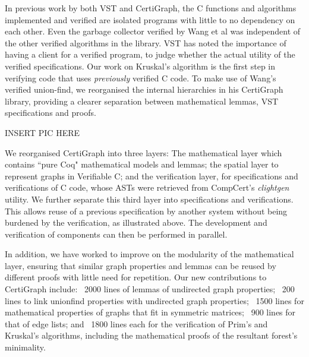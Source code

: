 In previous work by both VST and CertiGraph, the C functions and algorithms implemented and verified are isolated programs with little to no dependency on each other. Even the garbage collector verified by Wang et al\cite{DBLP:journals/pacmpl/WangCMH19} was independent of the other verified algorithms in the library. VST has noted the importance of having a client for a verified program, to judge whether the actual utility of the verified specifications\cite{DBLP:conf/iwmm/AppelN20}. Our work on Kruskal's algorithm is the first step in verifying code that uses \textit{previously} verified C code. To make use of Wang's verified union-find, we reorganised the internal hierarchies in his CertiGraph library, providing a clearer separation between mathematical lemmas, VST specifications and proofs.

INSERT PIC HERE

We reorganised CertiGraph into three layers: The mathematical layer which contains ``pure Coq" mathematical models and lemmas; the spatial layer to represent graphs in Verifiable C; and the verification layer, for specifications and verifications of C code, whose ASTs were retrieved from CompCert's \textit{clightgen} utility. We further separate this third layer into specifications and verifications. This allows reuse of a previous specification by another system without being burdened by the verification, as illustrated above. The development and verification of components can then be performed in parallel.

In addition, we have worked to improve on the modularity of the mathematical layer, ensuring that similar graph properties and lemmas can be reused by different proofs with little need for repetition. Our new contributions to CertiGraph include: ~2000 lines of lemmas of undirected graph properties; ~200 lines to link unionfind properties with undirected graph properties; ~1500 lines for mathematical properties of graphs that fit in symmetric matrices; ~900 lines for that of edge lists; and ~1800 lines each for the verification of Prim's and Kruskal's algorithms, including the mathematical proofs of the resultant forest's minimality.